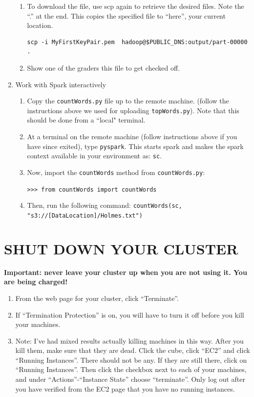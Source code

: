 \documentclass[11pt]{article}
\renewcommand\:{\colon} %
\begin{document}
\begin{enumerate}
\begin{enumerate}
\item To download the file, use scp again to retrieve the desired files. Note the ``.'' at the end. This copies the specified file to ``here'', your current location.

\begin{footnotesize}
\begin{verbatim}
scp -i MyFirstKeyPair.pem  hadoop@$PUBLIC_DNS:output/part-00000 .
\end{verbatim}
\end{footnotesize}

\item Show one of the graders this file to get checked off.

\end{enumerate}
\item Work with Spark interactively

\begin{enumerate}
  \item Copy the \texttt{countWords.py} file up to the remote machine.  (follow
    the instructions above we used for uploading \texttt{topWords.py}).  Note that this
    should be done from a ``local" terminal.
  \item At a terminal on the remote machine (follow instructions above if you
    have since exited), type \texttt{pyspark}. This starts spark and makes the
    spark context available in your environment as: \texttt{sc}.
  \item Now, import the \texttt{countWords} method from \texttt{countWords.py}:
  
    \texttt{>>> from countWords import countWords}

  \item Then, run the following command:
   {\footnotesize \texttt{countWords(sc, "s3://[DataLocation]/Holmes.txt")}}
    \end{enumerate}
\end{enumerate}


\section{SHUT DOWN YOUR CLUSTER}

{\bf Important: never leave your cluster up when you are not using it. You are being charged!}
\begin{enumerate}
\item From the web page for your cluster, click ``Terminate''.

\item If ``Termination Protection'' is on, you will have to turn it off before you kill your machines.
\item Note: I've had mixed results actually killing machines in this way. After you kill them, make sure that they are dead. Click the cube, click ``EC2'' and click ``Running Instances''. There should not be any. If they are still there, click on ``Running Instances''. Then click the checkbox next to each of your machines, and under ``Actions''-``Instance State'' choose ``terminate''. Only log out after you have verified from the EC2 page that you have no running instances.
\end{enumerate}
\end{document}
